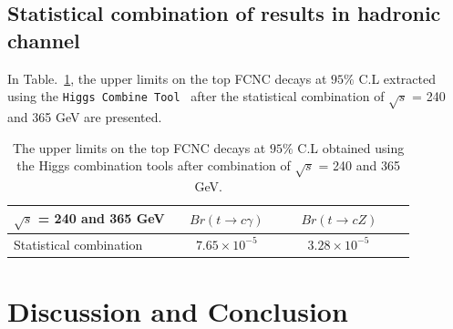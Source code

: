 \documentclass[11pt,onecolumn,english,showpacs,preprintnumbers,amsmath,amssymb,floatfix,nofootinbib]{revtex4-1}
\def\to{\rightarrow}
\begin{document}
%
\subsection{Statistical combination of results in hadronic channel}\label{Combination-hadronic}     
%


In Table.~\ref{limits-combination-hadronic}, the upper limits on the top FCNC     
decays at $95\%$ C.L extracted using 
the {\tt Higgs Combine Tool}~\cite{Higgs-Combination-Tool} after the statistical combination of $\sqrt {s}$ = 240 and 365 GeV are presented. 



\begin{table}[htbp]
\begin{center}
\begin{tabular}{l|c c c c }  \hline
$\sqrt {s}$ = 240 and 365 GeV  &  ~  $Br (t \to c \gamma )$    ~&  ~ $Br (t \to c Z)$      \\  \hline
 Statistical combination   &  ~  $ 7.65 \times 10^{-5}$          ~ & ~ $ 3.28 \times 10^{-5}$        \\   \hline  \hline  
\end{tabular}
\end{center}
\caption{The upper limits on the top FCNC decays at $95\%$ C.L obtained using the Higgs combination 
tools after combination of $\sqrt {s}$ = 240 and 365 GeV. }   
\label{limits-combination-hadronic}
\end{table}



%
\section{Discussion and Conclusion}\label{Conclusion}
%
\end{document}
